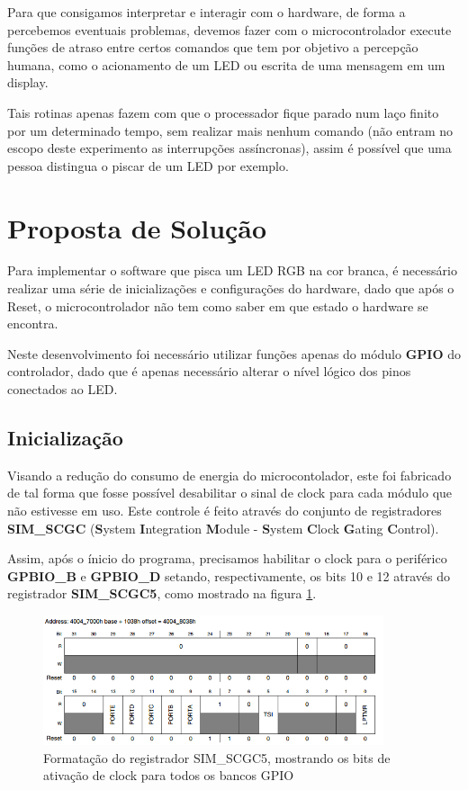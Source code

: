 \documentclass{article}
\begin{document}
Para que consigamos interpretar e interagir com o hardware, de forma a percebemos eventuais problemas, devemos fazer com o microcontrolador execute funções de atraso entre certos comandos que tem por objetivo a percepção humana, como o acionamento de um LED ou escrita de uma mensagem em um display.

Tais rotinas apenas fazem com que o processador fique parado num laço finito por um determinado tempo, sem realizar mais nenhum comando (não entram no escopo deste experimento as interrupções assíncronas), assim é possível que uma pessoa distingua o piscar de um LED por exemplo.


\section{Proposta de Solução}

Para implementar o software que pisca um LED RGB na cor branca, é necessário realizar uma série de inicializações e configurações do hardware, dado que após o Reset, o microcontrolador não tem como saber em que estado o hardware se encontra.

Neste desenvolvimento foi necessário utilizar funções apenas do módulo \textbf{GPIO} do controlador, dado que é apenas necessário alterar o nível lógico dos pinos conectados ao LED.

\subsection{Inicialização}
Visando a redução do consumo de energia do microcontolador, este foi fabricado de tal forma que fosse possível desabilitar o sinal de clock para cada módulo que não estivesse em uso. Este controle é feito através do conjunto de registradores \textbf{SIM\_SCGC} (\textbf{S}ystem \textbf{I}ntegration \textbf{M}odule - \textbf{S}ystem \textbf{C}lock \textbf{G}ating \textbf{C}ontrol).

Assim, após o ínicio do programa, precisamos habilitar o clock para o periférico \textbf{GPBIO\_B} e \textbf{GPBIO\_D} setando, respectivamente, os bits 10 e 12 através do registrador \textbf{SIM\_SCGC5}, como mostrado na figura \ref{sim_scgc5}.

\begin{figure}[ht!]
\centering
\includegraphics[width=100mm]{sim_scgc5.png}
\caption{Formatação do registrador SIM\_SCGC5, mostrando os bits de ativação de clock para todos os bancos GPIO  \label{sim_scgc5}}
\end{figure}
\end{document}
